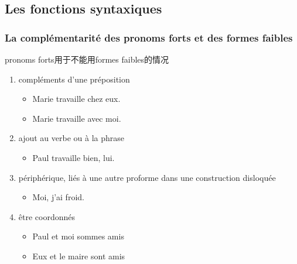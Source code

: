 \documentclass[UTF8]{report}
\begin{document}
\subsection{Les fonctions syntaxiques}

\subsubsection{La complémentarité des pronoms forts et des formes faibles}
pronoms forts用于不能用formes faibles的情况
\begin{enumerate}
    \item compléments d’une préposition
    \begin{itemize}
        \item Marie travaille chez eux.
        \item Marie travaille avec moi.
    \end{itemize}
    \item ajout au verbe ou à la phrase
    \begin{itemize}
        \item Paul travaille bien, lui.
    \end{itemize}
    \item périphérique, liés à une autre proforme dans une construction disloquée
    \begin{itemize}
        \item Moi, j’ai froid.
    \end{itemize}
    \item être coordonnés
    \begin{itemize}
        \item Paul et moi sommes amis
        \item Eux et le maire sont amis
    \end{itemize}
\end{enumerate}
\end{document}
